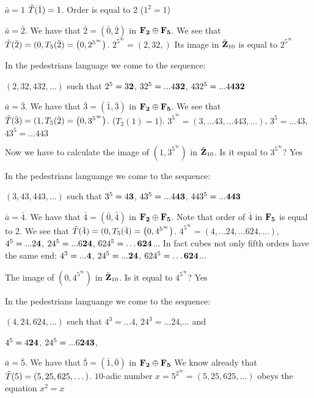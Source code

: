   $\bar a=1$  $\tilde T(\bar 1)=1$. Order is equal to $2$ ($1^2=1$)

\m


  $\bar a=\bar 2$. We have that   $\bar 2=(\bar 0,\bar 2)$ in $\bf F_2\oplus F_{5}$.
     We see that $\tilde T(\bar 2)=(0,T_5(\bar 2)=\left(0,2^{5^\infty}\right)$.
        $2^{5^\infty}=(2,32,)$
  Its image in $\tilde{{\bf Z}}_{10}$ is equal to $2^{5^\infty}$

In the pedestrians language we come to the sequence:

  $(2,32,432,\dots)$ such that  $2^5=3\bf 2$, $32^5=...4\bf 32$, $432^5=...4\bf 432$

\m



  $\bar a=\bar 3$. We have that   $\bar 3=(\bar 1,\bar 3)$ in $\bf F_2\oplus F_{5}$.
     We see that $\tilde T(\bar 3)=(1,T_5(\bar 2)=\left(0,3^{5^\infty}\right)$. ($T_2(1)=1$).
        $3^{5^\infty}=(3,\dots 43, \dots 443,\dots)$, $3^5=...43$, $43^5=...443$


  Now we have to calculate the image of $(1,3^{5^\infty})$  in $\tilde{{\bf Z}}_{10}$. Is it equal to $3^{5^\infty}$? Yes



In the pedestrians languange we come to the sequence:

  $(3,43,443,\dots)$ such that  $3^5=4\bf 3$, $43^5=...4\bf 43$, $443^5=...\bf 443$


\m

$\bar a=\bar 4$. We have that   $\bar 4=(\bar 0,\bar 4)$ in $\bf F_2\oplus F_{5}$.
Note that order of $\bar 4$ in $\bf F_5$ is equal to $2$.
     We see that $\tilde T(\bar 4)=(0,T_5(\bar 4)=\left(0,4^{5^\infty}\right)$.
        $4^{5^\infty}=(4,\dots 24, \dots624 ,\dots)$, $4^5=...2\bf 4$, $24^5=...6\bf 24$, $624^5=\dots \bf 624$...
In fact cubes not only fifth orders have the same end:
  $4^3=...\bf 4$, $24^5=...\bf 24$, $624^5=\dots \bf 624$...

The image of $(0,4^{5^\infty})$  in $\tilde{{\bf Z}}_{10}$. Is it equal to $4^{5^\infty}$? Yes

In the pedestrians languange we come to the sequence:

  $(4,24,624,\dots)$ such that
   $4^3=...4$, $24^3=...24$,... and

  $4^5=4\bf 24$, $24^5=...6\bf 243$,


  \m


    $\bar a=\bar 5$. We have that   $\bar 5=(\bar 1,\bar 0)$ in $\bf F_2\oplus F_{5}$
    We know already  that $\tilde T(5)=(5,25,625,\dots)$.
   $10$-adic number $x=5^{2^\infty}=(5,25,625,\dots)$
    obeys the equation $x^2=x$

